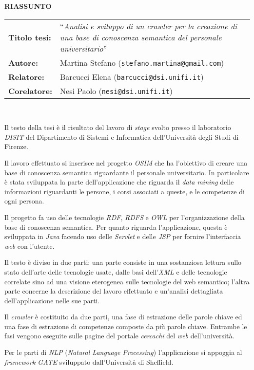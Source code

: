 \documentclass[11pt,a4paper]{article}
\begin{document}
\begin{center}
\textbf{\LARGE RIASSUNTO}
\\[0.5cm]
\begin{tabular}{lp{8cm}}
\textbf{Titolo tesi:} & ``\textit{Analisi e sviluppo di un crawler per la creazione di una base di conoscenza semantica del personale universitario}''\\[0.25cm]
\textbf{Autore:} & Martina Stefano (\texttt{stefano.martina@gmail.com})\\
\textbf{Relatore:} & Barcucci Elena (\texttt{barcucci@dsi.unifi.it})\\
\textbf{Corelatore:} & Nesi Paolo (\texttt{nesi@dsi.unifi.it})\\
\end{tabular}
\\[1.5cm]
\end{center}
Il testo della tesi \`e il risultato del lavoro di \emph{stage} svolto
presso il laboratorio \emph{DISIT} del Dipartimento di Sistemi e
Informatica dell'Universit\`a degli Studi di Firenze.

Il lavoro effettuato si inserisce nel progetto \emph{OSIM} che ha
l'obiettivo di creare una base di conoscenza semantica riguardante il
personale universitario. In particolare \`e
stata sviluppata la parte dell'applicazione che riguarda il \emph{data
mining} delle informazioni riguardanti le persone, i corsi associati a
queste, e le competenze di ogni persona.

Il progetto fa uso delle
tecnologie \emph{RDF}, \emph{RDFS} e \emph{OWL} per l'organizzazione
della base di conoscenza semantica. Per quanto riguarda
l'applicazione, questa \`e sviluppata in \emph{Java} facendo uso delle
\emph{Servlet} e delle \emph{JSP} per fornire l'interfaccia \emph{web}
con l'utente.

Il testo \`e diviso in due parti: una parte consiste in una
sostanziosa lettura sullo stato dell'arte delle tecnologie usate,
dalle basi dell'\emph{XML} e delle tecnologie correlate sino ad una
visione eterogenea sulle tecnologie del web semantico;
l'altra parte concerne la descrizione del lavoro effettuato e un'analisi
dettagliata dell'applicazione nelle sue parti.

Il \emph{crawler} \`e costituito da due parti, una fase di estrazione
delle parole chiave ed una fase di estrazione di competenze composte
da pi\`u parole chiave. Entrambe le fasi vengono eseguite sulle pagine
del portale \emph{cercachi} del \emph{web} dell'universit\`a.

Per le parti di \emph{NLP} (\emph{Natural Language Processing}) l'applicazione si
appoggia al \emph{framework GATE} sviluppato dall'Universit\`a di
Sheffield.
\end{document}
